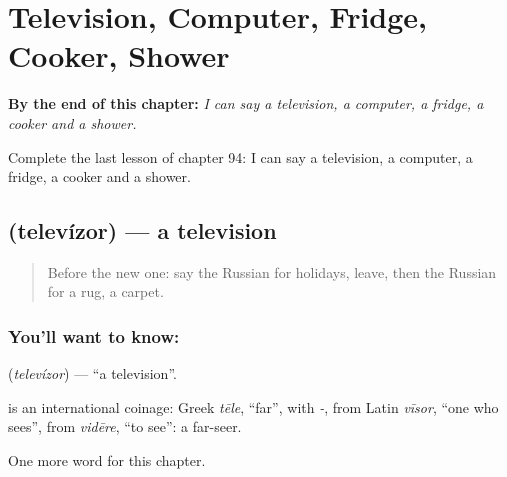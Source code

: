 
\chapter{Television, Computer, Fridge, Cooker, Shower}
\label{ch:ru-television-computer-fridge-cooker-shower}

\begin{chapteropening}
\textbf{By the end of this chapter:} \emph{I can say a television, a computer, a fridge, a cooker and a shower.}

Complete the last lesson of chapter 94: I can say a television, a computer, a fridge, a cooker and a shower.
\end{chapteropening}

\section[\texorpdfstring{\ru{телевизор} (televízor)}{телевизор (televízor)}]{ (televízor) — a television}

\label{lesson:RU-C94-television}



\begin{quote}
Before the new one: say the Russian for holidays, leave, then the Russian for a rug, a carpet.
\end{quote}

\subsection*{You'll want to know: }
\textbf{} (\emph{televízor}) — \textquotedblleft{}a television\textquotedblright{}.

\begin{cousinweb}
\textbf{} is an international coinage: Greek \emph{tēle}, \textquotedblleft{}far\textquotedblright{}, with \emph{-}, from Latin \emph{vīsor}, \textquotedblleft{}one who sees\textquotedblright{}, from \emph{vidēre}, \textquotedblleft{}to see\textquotedblright{}: a far-seer.
\end{cousinweb}

\begin{grammarlens}[title={What you've built}]
One more word for this chapter.
\end{grammarlens}

